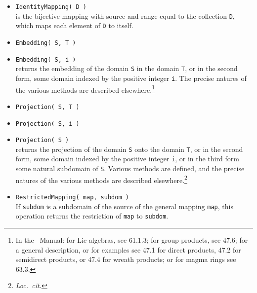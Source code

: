 \begin{itemize}
\item {\tt IdentityMapping( D )}\\
is the bijective mapping with source and range equal to the collection {\tt D}, which
maps each element of {\tt D} to itself.
\item  {\tt Embedding( S, T )}
\item  {\tt Embedding( S, i )}\\
returns the embedding of the domain {\tt S} in the domain {\tt T}, or in the second form, some domain indexed by
the positive integer {\tt i}. The precise natures of the various methods are
described elsewhere.\footnote{In the \gap\ Manual: for Lie algebras, see 61.1.3; for
  group products, see 47.6; for a general description, or for examples see 47.1 for
  direct products, 47.2 for semidirect products, or 47.4 for wreath products; or for
  magma rings see 63.3.} 
\item  {\tt Projection( S, T )}
\item  {\tt Projection( S, i )}
\item  {\tt Projection( S )}\\
returns the projection of the domain {\tt S} onto the domain {\tt T}, or in the
second form, some domain indexed by the positive integer {\tt i}, or in the third
form some natural subdomain of {\tt S}.
Various methods are defined, and the precise natures of the various methods are
described elsewhere.\footnote{{\it Loc.~cit.}}
\item  {\tt RestrictedMapping( map, subdom )}\\
If {\tt subdom} is a subdomain of the source of the general mapping {\tt map}, this
operation returns the restriction of {\tt map} to {\tt subdom}.
\end{itemize}
\subsectionspace

